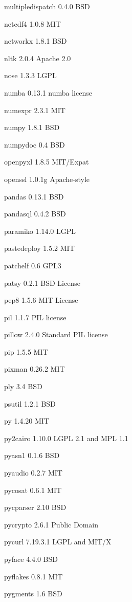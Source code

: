 \documentclass[letterpaper,10pt,openany,oneside]{sphinxmanual}
\begin{document}
\begin{DUlineblock}{0em}
\item[] multipledispatch      0.4.0   BSD
\item[] netcdf4       1.0.8   MIT
\item[] networkx      1.8.1   BSD
\item[] nltk  2.0.4   Apache 2.0
\item[] nose  1.3.3   LGPL
\item[] numba         0.13.1  numba license
\item[] numexpr       2.3.1   MIT
\item[] numpy         1.8.1   BSD
\item[] numpydoc      0.4     BSD
\item[] openpyxl      1.8.5   MIT/Expat
\item[] openssl       1.0.1g  Apache-style
\item[] pandas        0.13.1  BSD
\item[] pandasql      0.4.2   BSD
\item[] paramiko      1.14.0  LGPL
\item[] pastedeploy   1.5.2   MIT
\item[] patchelf      0.6     GPL3
\item[] patsy         0.2.1   BSD License
\item[] pep8  1.5.6   MIT License
\item[] pil   1.1.7   PIL license
\item[] pillow        2.4.0   Standard PIL license
\item[] pip   1.5.5   MIT
\item[] pixman        0.26.2  MIT
\item[] ply   3.4     BSD
\item[] psutil        1.2.1   BSD
\item[] py    1.4.20  MIT
\item[] py2cairo      1.10.0  LGPL 2.1 and MPL 1.1
\item[] pyasn1        0.1.6   BSD
\item[] pyaudio       0.2.7   MIT
\item[] pycosat       0.6.1   MIT
\item[] pycparser     2.10    BSD
\item[] pycrypto      2.6.1   Public Domain
\item[] pycurl        7.19.3.1        LGPL and MIT/X
\item[] pyface        4.4.0   BSD
\item[] pyflakes      0.8.1   MIT
\item[] pygments      1.6     BSD

\end{DUlineblock}
\end{document}
